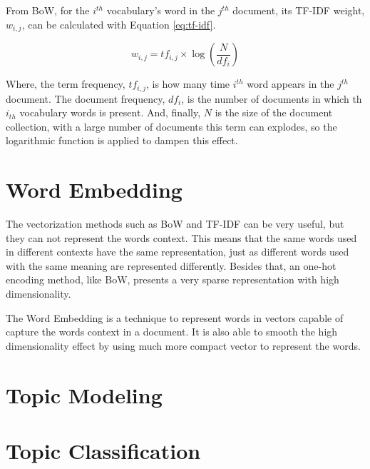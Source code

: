	From BoW, for the $i^{th}$ vocabulary's word in the $j^{th}$ document, its TF-IDF weight, $w_{i,j}$, can be calculated with Equation \ref{eq:tf-idf}.
	
	\begin{equation}
		\label{eq:tf-idf}
		w_{i, j} = tf_{i, j} \times \log\left(\dfrac{N}{df_{i}}\right)
	\end{equation}
	
	Where, the term frequency, $tf_{i, j}$, is how many time $i^{th}$ word appears in the $j^{th}$ document. The document frequency, $df_{i}$, is the number of documents in which th $i_{th}$ vocabulary words is present. And, finally, $N$ is the size of the document collection, with a large number of documents this term can explodes, so the logarithmic function is applied to dampen this effect.
	
		
\section{Word Embedding}

	The vectorization methods such as BoW and TF-IDF can be very useful, but they can not represent the words context. This means that the same words used in different contexts have the same representation, just as different words used with the same meaning are represented differently. Besides that, an one-hot encoding method, like BoW, presents a very sparse representation with high dimensionality. 
	
	The Word Embedding is a technique to represent words in vectors capable of capture the words context in a document. It is also able to smooth the high 
	dimensionality effect by using much more compact vector to represent the words.	


\section{Topic Modeling}

	

\section{Topic Classification}

